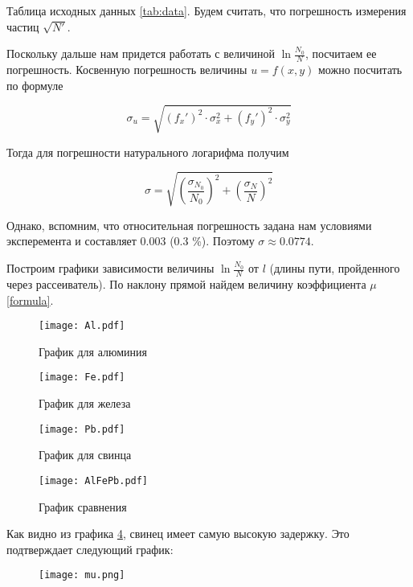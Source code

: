     Таблица исходных данных \ref{tab:data}. Будем считать, что погрешность измерения частиц $\sqrt{N'}$.
    

    Поскольку дальше нам придется работать с величиной $\ln \frac{N_0}{N}$, посчитаем ее погрешность.
    Косвенную погрешность величины $u = f(x, y)$ можно посчитать по формуле

    \[ \sigma_u = \sqrt{(f_x')^2 \cdot \sigma_x^2 + (f_y')^2 \cdot \sigma_y^2} \]

    Тогда для погрешности натурального логарифма получим

    \[ \sigma = \sqrt{\left(\frac{\sigma_{N_0}}{N_0} \right)^2 + \left(\frac{\sigma_{N}}{N} \right)^2} \]

    Однако, вспомним, что относительная погрешность задана нам условиями эксперемента и составляет 0.003 (0.3 \%).
    Поэтому $\sigma \approx 0.0774$.

    Построим графики зависимости величины $\ln \frac{N_0}{N}$ от $l$ (длины пути, пройденного через рассеиватель).
    По наклону прямой найдем величину коэффициента $\mu$ \eqref{formula}.

    \begin{figure}
        \centering
        \texttt{[image: Al.pdf]}
        \caption{График для алюминия}
        \label{fig:Al}
    \end{figure}

    \begin{figure}
        \centering
        \texttt{[image: Fe.pdf]}
        \caption{График для железа}
        \label{fig:Fe}
    \end{figure}

    \begin{figure}
        \centering
        \texttt{[image: Pb.pdf]}
        \caption{График для свинца}
        \label{fig:Pb}
    \end{figure}

    \begin{figure}
        \centering
        \texttt{[image: AlFePb.pdf]}
        \caption{График сравнения}
        \label{fig:comparing}
    \end{figure}

    Как видно из графика \ref{fig:comparing}, свинец имеет самую высокую задержку. Это подтверждает следующий график:
    
    \begin{figure}
        \centering
        \texttt{[image: mu.png]}
    \end{figure}

